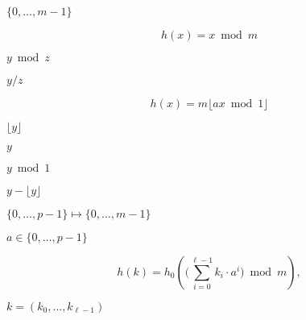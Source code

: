 \documentclass{article}
\begin{document}
$\{0,\ldots,m-1\}$
\pagebreak

\[ h(x) = x \bmod m \]
\pagebreak

$y \bmod z$
\pagebreak

$y / z$
\pagebreak

\[ h(x) = m \lfloor a x \bmod 1 \rfloor \]
\pagebreak

$\lfloor y \rfloor$
\pagebreak

$y$
\pagebreak

$y \bmod 1$
\pagebreak

$y - \lfloor y \rfloor$
\pagebreak

$\{0,\ldots,p-1\} \mapsto \{0,\ldots,m-1\}$
\pagebreak

$a \in \{0,\ldots,p-1\}$
\pagebreak

\[ h(k) = h_0 \left( \big(\sum_{i=0}^{\ell-1} k_i\cdot a^i \big) \bmod m \right), \]
\pagebreak

$k=(k_0,\ldots,k_{\ell-1})$
\pagebreak
\end{document}
